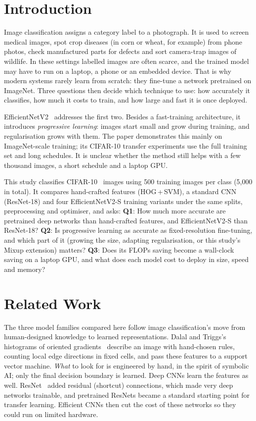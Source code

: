 \documentclass{COMPXXXX}
\begin{document}
\section{Introduction}
Image classification assigns a category label to a photograph. It is used to screen medical images,
spot crop diseases (in corn or wheat, for example) from phone photos, check manufactured parts for
defects and sort camera-trap images of wildlife. In these settings labelled images are often scarce,
and the trained model may have to run on a laptop, a phone or an embedded device. That is why modern
systems rarely learn from scratch: they fine-tune a network pretrained on ImageNet. Three questions
then decide which technique to use: how accurately it classifies, how much it costs to train, and how
large and fast it is once deployed.

EfficientNetV2~\cite{tan2021efficientnetv2} addresses the first two. Besides a fast-training
architecture, it introduces \emph{progressive learning}: images start small and grow during training,
and regularisation grows with them. The paper demonstrates this mainly on ImageNet-scale training; its
CIFAR-10 transfer experiments use the full training set and long schedules. It is unclear whether the
method still helps with a few thousand images, a short schedule and a laptop GPU.

This study classifies CIFAR-10~\cite{krizhevsky2009learning} images using 500 training images per
class (5{,}000 in total). It compares hand-crafted features (HOG\,+\,SVM), a standard CNN (ResNet-18)
and four EfficientNetV2-S training variants under the same splits, preprocessing and optimiser, and
asks:
\textbf{Q1}: How much more accurate are pretrained deep networks than hand-crafted features, and
EfficientNetV2-S than ResNet-18?
\textbf{Q2}: Is progressive learning as accurate as fixed-resolution fine-tuning, and which part of
it (growing the size, adapting regularisation, or this study's Mixup extension) matters?
\textbf{Q3}: Does its FLOPs saving become a wall-clock saving on a laptop GPU, and what does each
model cost to deploy in size, speed and memory?

\section{Related Work}\label{sec:related}
The three model families compared here follow image classification's move from human-designed
knowledge to learned representations. Dalal and Triggs's histograms of oriented
gradients~\cite{dalal2005histograms} describe an image with hand-chosen rules, counting local edge
directions in fixed cells, and pass these features to a support vector machine. \emph{What} to look
for is engineered by hand, in the spirit of symbolic AI; only the final decision boundary is learned.
Deep CNNs learn the features as well. ResNet~\cite{he2016deep} added residual (shortcut) connections,
which made very deep networks trainable, and pretrained ResNets became a standard starting point for
transfer learning. Efficient CNNs then cut the cost of these networks so they could run on limited
hardware.
\end{document}
